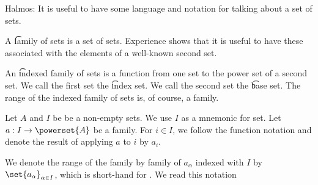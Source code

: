 

Halmos:
It is useful to have some language and notation for talking about a set of sets.


A \t{family} of sets is a set of sets.
Experience shows that it is
useful to have these associated
with the elements of a well-known
second set.

An \t{indexed family of sets} is a function
from one set to the power set of a second set.
We call the first set the \t{index set}.
We call the second set the \t{base set}.
The range of the indexed family of sets is, of course, a family.




Let $A$ and $I$ be be a non-empty sets.
We use $I$ as a mnemonic for 
set.
Let $a: I \to \powerset{A}$ be a family.
For $i \in I$, we follow the function notation
and denote the result of applying $a$ to $i$ by
$a_{i}$.

We denote the range of the family by
family of $a_{\alpha}$ indexed with $I$
by $\set{a_{\alpha}}_{\alpha \in I}$, which is short-hand
for .
We read this notation 

\blankpage
